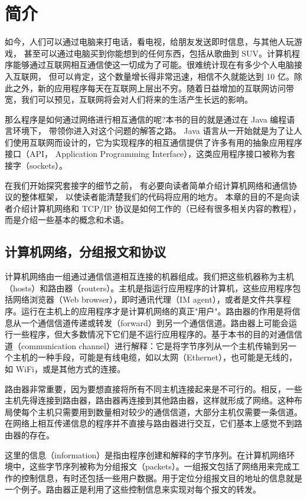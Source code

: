 
\chapter{简介}

	如今，人们可以通过电脑来打电话，看电视，给朋友发送即时信息，与其他人玩游戏， 甚至可以通过电脑买到你能想到的任何东西，包括从歌曲到 SUV。计算机程序能够通过互联网相互通信使这一切成为了可能。很难统计现在有多少个人电脑接入互联网， 但可以肯定，这个数量增长得非常迅速，相信不久就能达到 10 亿。除此之外，新的应用程序每天在互联网上层出不穷。随着日益增加的互联网访问带宽，我们可以预见，互联网将会对人们将来的生活产生长远的影响。

	那么程序是如何通过网络进行相互通信的呢?本书的目的就是通过在 Java 编程语言环境下， 带领你进入对这个问题的解答之路。 Java 语言从一开始就是为了让人们使用互联网而设计的，它为实现程序的相互通信提供了许多有用的抽象应用程序接口（API， Application Programming Interface），这类应用程序接口被称为套接字（sockets）。

	在我们开始探究套接字的细节之前， 有必要向读者简单介绍计算机网络和通信协议的整体框架， 以使读者能清楚我们的代码将应用的地方。 本章的目的不是向读者介绍计算机网络和 TCP/IP 协议是如何工作的（已经有很多相关内容的教程），而是介绍一些基本的概念和术语。


	\section{计算机网络，分组报文和协议}

		计算机网络由一组通过通信信道相互连接的机器组成。我们把这些机器称为主机（hosts）和路由器（routers）。主机是指运行应用程序的计算机，这些应用程序包括网络浏览器（Web browser），即时通讯代理（IM agent），或者是文件共享程序。运行在主机上的应用程序才是计算机网络的真正"用户"。路由器的作用是将信息从一个通信信道传递或转发（forward）到另一个通信信道。路由器上可能会运行一些程序，但大多数情况下它们是不运行应用程序的。基于本书的目的对通信信道（communication channel）进行解释：它是将字节序列从一个主机传输到另一个主机的一种手段，可能是有线电缆，如以太网（Ethernet），也可能是无线的，如 WiFi，或是其他方式的连接。

		路由器非常重要，因为要想直接将所有不同主机连接起来是不可行的。相反，一些主机先得连接到路由器，路由器再连接到其他路由器，这样就形成了网络。这种布局使每个主机只需要用到数量相对较少的通信信道，大部分主机仅需要一条信道。在网络上相互传递信息的程序并不直接与路由器进行交互，它们基本上感觉不到路由器的存在。

		这里的信息（information）是指由程序创建和解释的字节序列。在计算机网络环境中，这些字节序列被称为分组报文（packets）。一组报文包括了网络用来完成工作的控制信息，有时还包括一些用户数据。用于定位分组报文目的地址的信息就是一个例子。路由器正是利用了这些控制信息来实现对每个报文的转发。

